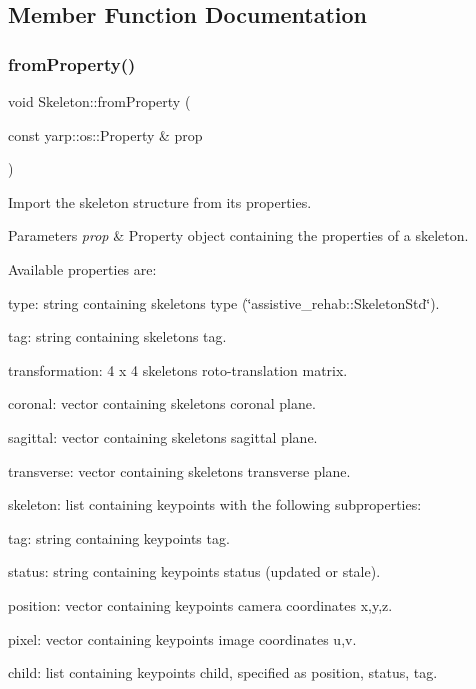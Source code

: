\subsection{Member Function Documentation}
\mbox{\label{classassistive__rehab_1_1Skeleton_ac844f66503de87859833056dc33a835b}} 
\subsubsection{\texorpdfstring{from\+Property()}{fromProperty()}}
{\footnotesize\ttfamily void Skeleton\+::from\+Property (\begin{DoxyParamCaption}\item[{const yarp\+::os\+::\+Property \&}]{prop }\end{DoxyParamCaption})\hspace{0.3cm}{\ttfamily [virtual]}}



Import the skeleton structure from its properties. 


\begin{DoxyParams}{Parameters}
{\em prop} & Property object containing the properties of a skeleton.\\
\hline
\end{DoxyParams}
Available properties are\+:
\begin{DoxyItemize}
\item type\+: string containing skeleton\textquotesingle{}s type (\char`\"{}assistive\+\_\+rehab\+::\+Skeleton\+Std\char`\"{}).
\item tag\+: string containing skeleton\textquotesingle{}s tag.
\item transformation\+: 4 x 4 skeleton\textquotesingle{}s roto-\/translation matrix.
\item coronal\+: vector containing skeleton\textquotesingle{}s coronal plane.
\item sagittal\+: vector containing skeleton\textquotesingle{}s sagittal plane.
\item transverse\+: vector containing skeleton\textquotesingle{}s transverse plane.
\item skeleton\+: list containing keypoints with the following subproperties\+:
\begin{DoxyItemize}
\item tag\+: string containing keypoint\textquotesingle{}s tag.
\item status\+: string containing keypoint\textquotesingle{}s status (updated or stale).
\item position\+: vector containing keypoint\textquotesingle{}s camera coordinates x,y,z.
\item pixel\+: vector containing keypoint\textquotesingle{}s image coordinates u,v.
\item child\+: list containing keypoint\textquotesingle{}s child, specified as position, status, tag. 
\end{DoxyItemize}
\end{DoxyItemize}

